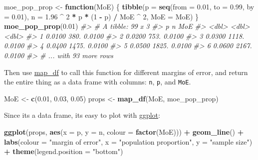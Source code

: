 \documentclass[]{book}
\newenvironment{Shaded}{\begin{snugshade}}{\end{snugshade}}
\newcommand{\CommentTok}[1]{\textcolor[rgb]{0.56,0.35,0.01}{\textit{#1}}}
\newcommand{\ControlFlowTok}[1]{\textcolor[rgb]{0.13,0.29,0.53}{\textbf{#1}}}
\newcommand{\DataTypeTok}[1]{\textcolor[rgb]{0.13,0.29,0.53}{#1}}
\newcommand{\DecValTok}[1]{\textcolor[rgb]{0.00,0.00,0.81}{#1}}
\newcommand{\FloatTok}[1]{\textcolor[rgb]{0.00,0.00,0.81}{#1}}
\newcommand{\KeywordTok}[1]{\textcolor[rgb]{0.13,0.29,0.53}{\textbf{#1}}}
\newcommand{\NormalTok}[1]{#1}
\newcommand{\OperatorTok}[1]{\textcolor[rgb]{0.81,0.36,0.00}{\textbf{#1}}}
\newcommand{\StringTok}[1]{\textcolor[rgb]{0.31,0.60,0.02}{#1}}
\theoremstyle{definition}
\theoremstyle{definition}
\theoremstyle{definition}
\theoremstyle{remark}
\begin{document}
\begin{Shaded}
\begin{Highlighting}[]
\NormalTok{moe_pop_prop <-}\StringTok{ }\ControlFlowTok{function}\NormalTok{(MoE) \{}
  \KeywordTok{tibble}\NormalTok{(}\DataTypeTok{p =} \KeywordTok{seq}\NormalTok{(}\DataTypeTok{from =} \FloatTok{0.01}\NormalTok{, }\DataTypeTok{to =} \FloatTok{0.99}\NormalTok{, }\DataTypeTok{by =} \FloatTok{0.01}\NormalTok{),}
         \DataTypeTok{n =} \FloatTok{1.96} \OperatorTok{^}\StringTok{ }\DecValTok{2} \OperatorTok{*}\StringTok{ }\NormalTok{p }\OperatorTok{*}\StringTok{ }\NormalTok{(}\DecValTok{1} \OperatorTok{-}\StringTok{ }\NormalTok{p) }\OperatorTok{/}\StringTok{ }\NormalTok{MoE }\OperatorTok{^}\StringTok{ }\DecValTok{2}\NormalTok{,}
         \DataTypeTok{MoE =}\NormalTok{ MoE)}
\NormalTok{\}}
\KeywordTok{moe_pop_prop}\NormalTok{(}\FloatTok{0.01}\NormalTok{)}
\CommentTok{#> # A tibble: 99 x 3}
\CommentTok{#>        p     n    MoE}
\CommentTok{#>    <dbl> <dbl>  <dbl>}
\CommentTok{#> 1 0.0100  380. 0.0100}
\CommentTok{#> 2 0.0200  753. 0.0100}
\CommentTok{#> 3 0.0300 1118. 0.0100}
\CommentTok{#> 4 0.0400 1475. 0.0100}
\CommentTok{#> 5 0.0500 1825. 0.0100}
\CommentTok{#> 6 0.0600 2167. 0.0100}
\CommentTok{#> # ... with 93 more rows}
\end{Highlighting}
\end{Shaded}

Then use
\href{https://www.rdocumentation.org/packages/purrr/topics/map_df}{map\_df}
to call this function for different margins of error, and return the
entire thing as a data frame with columns: \texttt{n}, \texttt{p}, and
\texttt{MoE}.

\begin{Shaded}
\begin{Highlighting}[]
\NormalTok{MoE <-}\StringTok{ }\KeywordTok{c}\NormalTok{(}\FloatTok{0.01}\NormalTok{, }\FloatTok{0.03}\NormalTok{, }\FloatTok{0.05}\NormalTok{)}
\NormalTok{props <-}\StringTok{ }\KeywordTok{map_df}\NormalTok{(MoE, moe_pop_prop)}
\end{Highlighting}
\end{Shaded}

Since its a data frame, its easy to plot with
\href{https://www.rdocumentation.org/packages/ggplot2/topics/ggplot}{ggplot}:

\begin{Shaded}
\begin{Highlighting}[]
\KeywordTok{ggplot}\NormalTok{(props, }\KeywordTok{aes}\NormalTok{(}\DataTypeTok{x =}\NormalTok{ p, }\DataTypeTok{y =}\NormalTok{ n, }\DataTypeTok{colour =} \KeywordTok{factor}\NormalTok{(MoE))) }\OperatorTok{+}
\StringTok{  }\KeywordTok{geom_line}\NormalTok{() }\OperatorTok{+}
\StringTok{  }\KeywordTok{labs}\NormalTok{(}\DataTypeTok{colour =} \StringTok{"margin of error"}\NormalTok{,}
       \DataTypeTok{x =} \StringTok{"population proportion"}\NormalTok{,}
       \DataTypeTok{y =} \StringTok{"sample size"}\NormalTok{) }\OperatorTok{+}
\StringTok{  }\KeywordTok{theme}\NormalTok{(}\DataTypeTok{legend.position =} \StringTok{"bottom"}\NormalTok{)}
\end{Highlighting}
\end{Shaded}
\end{document}
